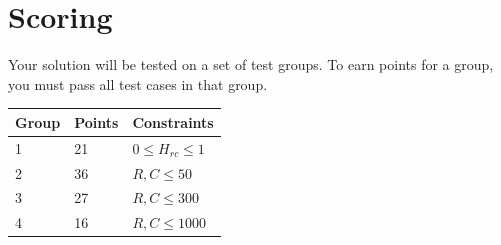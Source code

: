 \section*{Scoring}
Your solution will be tested on a set of test groups. To earn points for a group, you must pass all test cases in that group.

\begin{tabular}{|l|l|l|}
\hline
Group & Points & Constraints \\ \hline
 1     & 21         &  $0 \leq H_{rc} \leq 1$ \\ \hline
 2     & 36         &  $R,C \leq 50$ \\ \hline
 3     & 27         &  $R,C \leq 300$ \\ \hline
 4     & 16         &  $R,C \leq 1000$ \\ \hline
\end{tabular}

